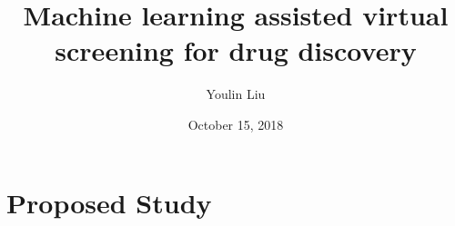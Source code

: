 
\author{Youlin Liu}
\title{Machine learning assisted virtual screening for drug discovery}
\date{October 15, 2018}
\hypersetup{pdfpagemode=FullScreen}




\begin{frame}
\maketitle 
\end{frame}


\section{Proposed Study}


